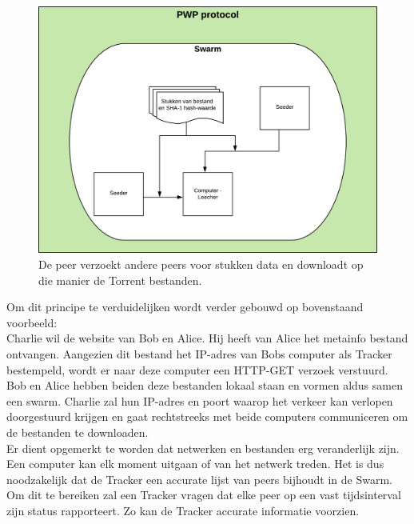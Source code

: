 \begin{figure}[h!]
	\centering
		\includegraphics[scale=0.6]{torrent-3.png}
	\caption[PWP stap - Torrenting 3]{De peer verzoekt andere peers voor stukken data en downloadt op die manier de Torrent bestanden.}
\end{figure}
\newpage
Om dit principe te verduidelijken wordt verder gebouwd op bovenstaand voorbeeld:\\

Charlie wil de website van Bob en Alice. Hij heeft van Alice het metainfo bestand ontvangen. Aangezien dit bestand het IP-adres van Bobs computer als Tracker bestempeld, wordt er naar deze computer een HTTP-GET verzoek verstuurd. Bob en Alice hebben beiden deze bestanden lokaal staan en vormen aldus samen een swarm. Charlie zal hun IP-adres en poort waarop het verkeer kan verlopen doorgestuurd krijgen en gaat rechtstreeks met beide computers communiceren om de bestanden te downloaden.\\

Er dient opgemerkt te worden dat netwerken en bestanden erg veranderlijk zijn. Een computer kan elk moment uitgaan of van het netwerk treden. Het is dus noodzakelijk dat de Tracker een accurate lijst van peers bijhoudt in de Swarm. Om dit te bereiken zal een Tracker vragen dat elke peer op een vast tijdsinterval zijn status rapporteert. Zo kan de Tracker accurate informatie voorzien.\\

